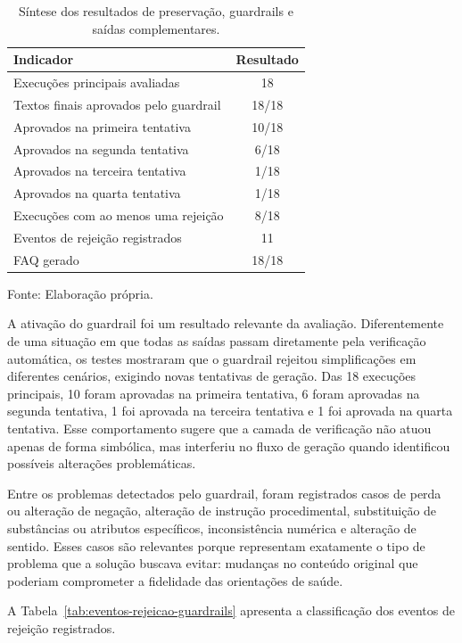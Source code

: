 \begin{table}[htbp]
  \centering
  \caption{Síntese dos resultados de preservação, guardrails e saídas complementares.}
  \label{tab:preservacao-guardrails-saidas}
  \small
  \begin{tabularx}{\textwidth}{Xc}
    \toprule
    \textbf{Indicador} & \textbf{Resultado} \\
    \midrule
    Execuções principais avaliadas & 18 \\
    Textos finais aprovados pelo guardrail & 18/18 \\
    Aprovados na primeira tentativa & 10/18 \\
    Aprovados na segunda tentativa & 6/18 \\
    Aprovados na terceira tentativa & 1/18 \\
    Aprovados na quarta tentativa & 1/18 \\
    Execuções com ao menos uma rejeição & 8/18 \\
    Eventos de rejeição registrados & 11 \\
    FAQ gerado & 18/18 \\
    \bottomrule
  \end{tabularx}

  {\footnotesize Fonte: Elaboração própria.}
\end{table}

A ativação do guardrail foi um resultado relevante da avaliação. Diferentemente de uma situação em que todas as saídas passam diretamente pela verificação automática, os testes mostraram que o guardrail rejeitou simplificações em diferentes cenários, exigindo novas tentativas de geração. Das 18 execuções principais, 10 foram aprovadas na primeira tentativa, 6 foram aprovadas na segunda tentativa, 1 foi aprovada na terceira tentativa e 1 foi aprovada na quarta tentativa. Esse comportamento sugere que a camada de verificação não atuou apenas de forma simbólica, mas interferiu no fluxo de geração quando identificou possíveis alterações problemáticas.

Entre os problemas detectados pelo guardrail, foram registrados casos de perda ou alteração de negação, alteração de instrução procedimental, substituição de substâncias ou atributos específicos, inconsistência numérica e alteração de sentido. Esses casos são relevantes porque representam exatamente o tipo de problema que a solução buscava evitar: mudanças no conteúdo original que poderiam comprometer a fidelidade das orientações de saúde.

A Tabela~\ref{tab:eventos-rejeicao-guardrails} apresenta a classificação dos eventos de rejeição registrados.

